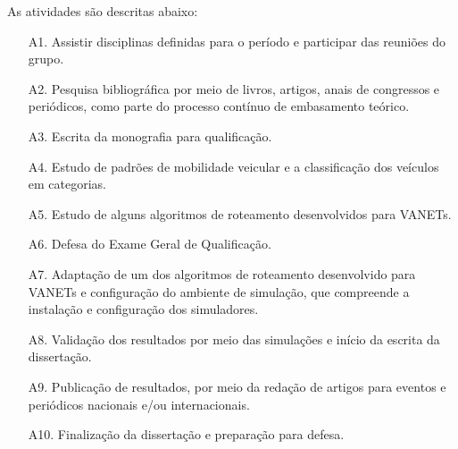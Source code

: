 \documentclass[mestrado, pre-defesa, english, brazil]{packages/icmc}
\begin{document}
As atividades são descritas abaixo:
\begin{enumerate}
    \item[A1.] Assistir disciplinas definidas para o período e participar das reuniões do grupo.
    \item[A2.] Pesquisa bibliográfica por meio de livros, artigos, anais de congressos e periódicos, como parte do processo contínuo de embasamento teórico.
    \item[A3.] Escrita da monografia para qualificação.
    \item[A4.] Estudo de padrões de mobilidade veicular e a classificação dos veículos em categorias.
    \item[A5.] Estudo de alguns algoritmos de roteamento desenvolvidos para VANETs.
    \item[A6.] Defesa do Exame Geral de Qualificação.
    \item[A7.] Adaptação de um dos algoritmos de roteamento desenvolvido para VANETs e configuração do ambiente de simulação, que compreende a instalação e configuração dos simuladores.
    \item[A8.] Validação dos resultados por meio das simulações e início da escrita da dissertação.
    \item[A9.] Publicação de resultados, por meio da redação de artigos para eventos e periódicos nacionais e/ou internacionais.
    \item[A10.] Finalização da dissertação e preparação para defesa.
\end{enumerate}



\end{document}
